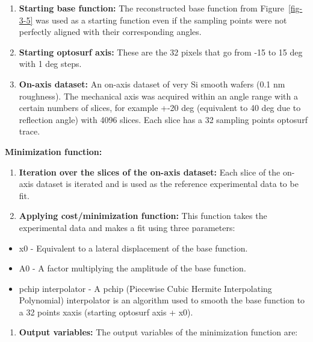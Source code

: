 \documentclass[
  letterpaper,
  DIV=11,
  numbers=noendperiod,
  oneside]{scrreprt}
\providecommand{\tightlist}{%
  \setlength{\itemsep}{0pt}\setlength{\parskip}{0pt}}\usepackage{longtable,booktabs,array}
\begin{document}
\begin{enumerate}
\def\labelenumi{\arabic{enumi}.}
\item
  \textbf{Starting base function:} The reconstructed base function from
  Figure~\ref{fig-3-5} was used as a starting function even if the
  sampling points were not perfectly aligned with their corresponding
  angles.
\item
  \textbf{Starting optosurf axis:} These are the 32 pixels that go from
  -15 to 15 deg with 1 deg steps.
\item
  \textbf{On-axis dataset:} An on-axis dataset of very Si smooth wafers
  (0.1 nm roughness). The mechanical axis was acquired within an angle
  range with a certain numbers of slices, for example +-20 deg
  (equivalent to 40 deg due to reflection angle) with 4096 slices. Each
  slice has a 32 sampling points optosurf trace.
\end{enumerate}

\textbf{Minimization function:}

\begin{enumerate}
\def\labelenumi{\arabic{enumi}.}
\setcounter{enumi}{3}
\item
  \textbf{Iteration over the slices of the on-axis dataset:} Each slice
  of the on-axis dataset is iterated and is used as the reference
  experimental data to be fit.
\item
  \textbf{Applying cost/minimization function:} This function takes the
  experimental data and makes a fit using three parameters:
\end{enumerate}

\begin{itemize}
\tightlist
\item
  x0 - Equivalent to a lateral displacement of the base function.
\item
  A0 - A factor multiplying the amplitude of the base function.
\item
  pchip interpolator - A pchip (Piecewise Cubic Hermite Interpolating
  Polynomial) interpolator is an algorithm used to smooth the base
  function to a 32 points xaxis (starting optosurf axis + x0).
\end{itemize}

\begin{enumerate}
\def\labelenumi{\arabic{enumi}.}
\setcounter{enumi}{5}
\tightlist
\item
  \textbf{Output variables:} The output variables of the minimization
  function are:
\end{enumerate}
\end{document}
